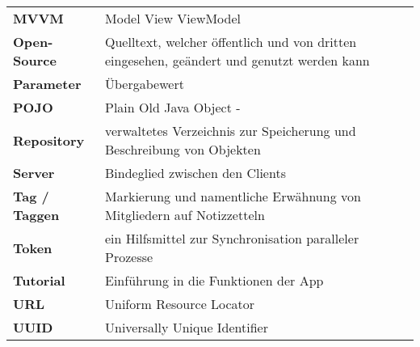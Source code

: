 \begin{table}[h!]
\begin{tabular}{p{4cm}p{10cm}}
				\textbf{MVVM} & Model View ViewModel  \\
				\textbf{Open-Source} & Quelltext, welcher öffentlich und von dritten eingesehen, geändert und genutzt werden kann  \\
				\textbf{Parameter} & Übergabewert  \\
				\textbf{POJO} & Plain Old Java Object  -   \\
				\textbf{Repository} &  verwaltetes Verzeichnis zur Speicherung und Beschreibung von Objekten \\
				\textbf{Server} & Bindeglied zwischen den Clients   \\
				\textbf{Tag / Taggen} &  Markierung und namentliche Erwähnung von Mitgliedern auf Notizzetteln   \\
				\textbf{Token} & ein Hilfsmittel zur Synchronisation paralleler Prozesse  \\
				\textbf{Tutorial} &  Einführung in die Funktionen der App \\
				\textbf{URL} & Uniform Resource Locator  \\
				\textbf{UUID} & Universally Unique Identifier   \\				
			\end{tabular}
		\end{table}